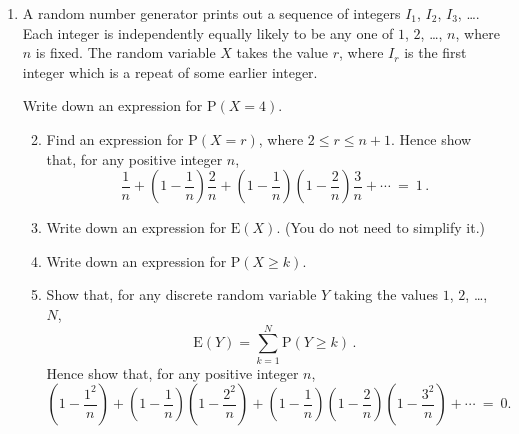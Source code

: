 \documentclass[a4, 11pt]{report}
\newlength{\qspace}
\newcounter{qnumber}
\newenvironment{question}%
 {\vspace{\qspace}
  \begin{enumerate}[\bfseries 1\quad][10]%
    \setcounter{enumi}{\value{qnumber}}%
    \item%
 }
{
  \end{enumerate}
  \filbreak
  \stepcounter{qnumber}
 }
\newenvironment{questionparts}[1][1]%
 {
  \begin{enumerate}[\bfseries (i)]%
    \setcounter{enumii}{#1}
    \addtocounter{enumii}{-1}
    \setlength{\itemsep}{5mm}
    \setlength{\parskip}{8pt}
 }
 {
  \end{enumerate}
 }
\def\le{\leqslant}
\def\ge{\geqslant}
\renewcommand{\.}[1]{\ensuremath{\mathrm{#1}}}
\newcommand{\+}[1]{\ensuremath{\mathbf{#1}}}
\begin{document}
\begin{question}
  A random number generator prints out a sequence of integers $I_1$,
  $I_2$, $I_3$, \dots. Each integer is independently equally
  likely to be any one of $1$, $2$, \dots, $n$, where $n$ is
  fixed.  The random variable $X$ takes the value $r$, where $I_r$ is
  the first integer which is a repeat of some earlier integer.

  Write down an expression for $\.P(X=4)$.

  \begin{questionparts}
  \item Find an expression for $\.P(X=r)$, where $2\le r\le n+1$.  Hence show
    that, for any positive integer $n$,
    \[
    \frac 1n + \left(1-\frac1n\right) \frac 2 n +
    \left(1-\frac1n\right)\left(1-\frac2n\right) \frac3 n + \cdots  \ =  \ 1
    \,.
    \]
  \item Write down an expression for $\.E(X)$.  (You do not need to
    simplify it.)
  \item Write down an expression for $\.P(X\ge k)$.

  \item Show that, for any discrete random variable $Y$ taking the
    values $1$, $2$, \dots, $N$,
    \[
    \.E(Y) = \sum_{k=1}^N \.P(Y\ge k)\,.
    \]
    Hence show that, for any positive integer $n$,
    \[
    \left(1-\frac{1^2}n\right) +
    \left(1-\frac1n\right)\left(1-\frac{2^2}n\right) +
    \left(1-\frac1n\right)\left(1-\frac{2}n\right)\left(1-\frac{3^2}n\right)
    + \cdots \ = \ 0.
    \]
  \end{questionparts}
\end{question}
\end{document}
